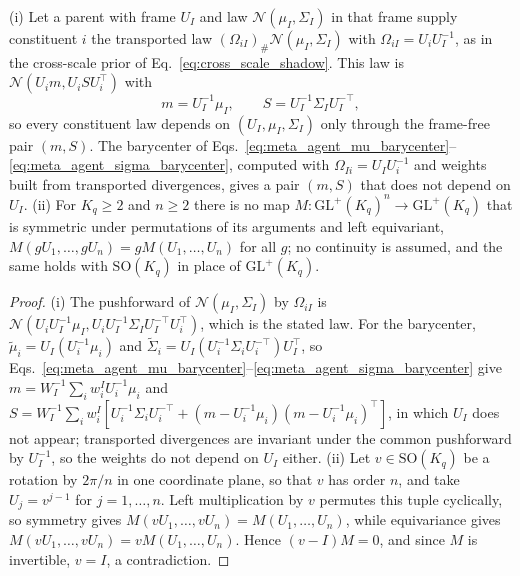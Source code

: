\begin{proposition}
\label{prop:parent_frame_gauge}
(i) Let a parent with frame $U_I$ and law $\mathcal{N}(\mu_I, \Sigma_I)$ in that frame supply constituent $i$ the transported law $(\Omega_{iI})_\#\mathcal{N}(\mu_I, \Sigma_I)$ with $\Omega_{iI} = U_i U_I^{-1}$, as in the cross-scale prior of Eq.~\eqref{eq:cross_scale_shadow}. This law is $\mathcal{N}(U_i m, U_i S U_i^\top)$ with
\begin{equation*}
m = U_I^{-1}\mu_I, \qquad S = U_I^{-1}\Sigma_I U_I^{-\top},
\end{equation*}
so every constituent law depends on $(U_I, \mu_I, \Sigma_I)$ only through the frame-free pair $(m, S)$. The barycenter of Eqs.~\eqref{eq:meta_agent_mu_barycenter}--\eqref{eq:meta_agent_sigma_barycenter}, computed with $\Omega_{Ii} = U_I U_i^{-1}$ and weights built from transported divergences, gives a pair $(m, S)$ that does not depend on $U_I$.
(ii) For $K_q \ge 2$ and $n \ge 2$ there is no map $M: \mathrm{GL}^+(K_q)^n \to \mathrm{GL}^+(K_q)$ that is symmetric under permutations of its arguments and left equivariant, $M(gU_1, \ldots, gU_n) = g M(U_1, \ldots, U_n)$ for all $g$; no continuity is assumed, and the same holds with $\mathrm{SO}(K_q)$ in place of $\mathrm{GL}^+(K_q)$.
\end{proposition}

\begin{proof}
(i) The pushforward of $\mathcal{N}(\mu_I, \Sigma_I)$ by $\Omega_{iI}$ is $\mathcal{N}(U_i U_I^{-1}\mu_I, U_i U_I^{-1}\Sigma_I U_I^{-\top} U_i^\top)$, which is the stated law. For the barycenter, $\tilde{\mu}_i = U_I (U_i^{-1}\mu_i)$ and $\tilde{\Sigma}_i = U_I (U_i^{-1}\Sigma_i U_i^{-\top}) U_I^\top$, so Eqs.~\eqref{eq:meta_agent_mu_barycenter}--\eqref{eq:meta_agent_sigma_barycenter} give $m = W_I^{-1}\sum_i w_i^I U_i^{-1}\mu_i$ and $S = W_I^{-1}\sum_i w_i^I [U_i^{-1}\Sigma_i U_i^{-\top} + (m - U_i^{-1}\mu_i)(m - U_i^{-1}\mu_i)^\top]$, in which $U_I$ does not appear; transported divergences are invariant under the common pushforward by $U_I^{-1}$, so the weights do not depend on $U_I$ either. (ii) Let $v \in \mathrm{SO}(K_q)$ be a rotation by $2\pi/n$ in one coordinate plane, so that $v$ has order $n$, and take $U_j = v^{j-1}$ for $j = 1, \ldots, n$. Left multiplication by $v$ permutes this tuple cyclically, so symmetry gives $M(vU_1, \ldots, vU_n) = M(U_1, \ldots, U_n)$, while equivariance gives $M(vU_1, \ldots, vU_n) = vM(U_1, \ldots, U_n)$. Hence $(v - I)M = 0$, and since $M$ is invertible, $v = I$, a contradiction.
\end{proof}

